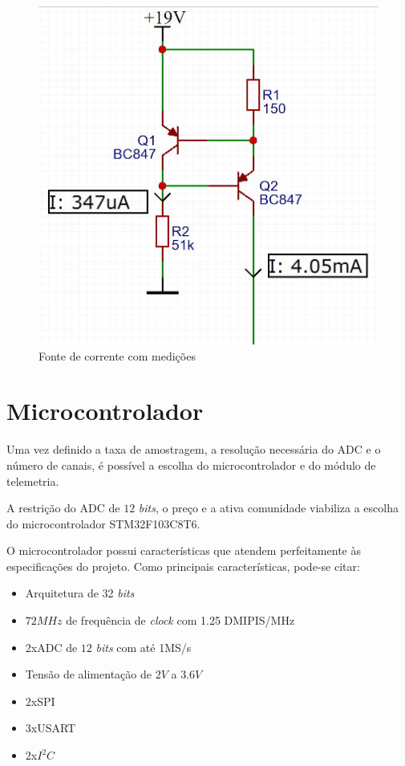 \documentclass[
	12pt,				%
	openright,			%
	twoside,			%
	a4paper,			%
	english,			%
	french,				%
	spanish,			%
	brazil,				%
	]{abntex2}
\begin{document}
		\begin{figure}[!ht]
			\centering
			\includegraphics[scale = 0.3]{../Fotos/fonteCorrente2.jpg}
			\caption{Fonte de corrente com medições}
			\label{fig:topologiaFonteCorrenteValores}
		\end{figure}

	\section{Microcontrolador}
		Uma vez definido a taxa de amostragem, a resolução necessária do
		ADC e o número de canais, é possível a escolha do
		microcontrolador e do módulo de telemetria.

		A restrição do ADC de $12$ \textit{bits}, o preço e a ativa comunidade viabiliza a escolha do microcontrolador STM32F103C8T6.\cite{stm}

		O microcontrolador possui características que
		atendem perfeitamente às especificações do projeto. Como
		principais características, pode-se citar:

		\begin{itemize}
			\item Arquitetura de 32 \textit{bits}
			\item $72MHz$ de frequência de \textit{clock} com 1.25 DMIPIS/MHz
			\item 2xADC de $12$ \textit{bits} com até 1MS/s
			\item Tensão de alimentação de $2V$ a $3.6V$
			\item 2xSPI
			\item 3xUSART
			\item 2x$I^2C$
		\end{itemize}
\end{document}
